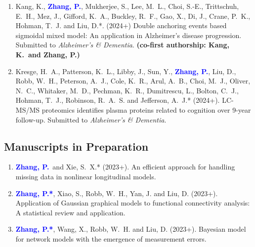\documentclass[12pt]{article}
\newcommand{\PZ}{\textcolor{blue}{\textbf{Zhang, P.*}}}
\newcommand{\PZnot}{\textcolor{blue}{\textbf{Zhang, P.}}}
\begin{document}
\begin{enumerate}
		\item {\sc Kang, K.}, \PZnot, {\sc Mukherjee, S., Lee, M.\ 
		L., Choi, S.-E., Trittschuh, E.\ H., Mez, J., Gifford, K.\ 
		A., Buckley, R.\ F., Gao, X., Di, J., Crane, P.\ K., Hohman, 
		T.\ J.} and {\sc Liu, D.*}. (2024+) Double anchoring events 
		based sigmoidal mixed model: An application in Alzheimer's 
		disease progression. Submitted to {\em Alzheimer's \& 
		Dementia}. {\bf (co-first authorship: Kang, K.\ and Zhang, 
		P.)}
		
		\item {\sc Kresge, H.\ A., Patterson, K.\ L., Libby, J., 
		Sun, Y.,} \PZnot, {\sc Liu, D., Robb, W.\ H., Peterson, A.\ 
		J., Cole, K.\ R., Arul, A.\ B., Choi, M.\ J., Oliver, N.\ 
		C., Whitaker, M.\ D., Pechman, K.\ R., Dumitrescu, L., 
		Bolton, C.\ J., Hohman, T.\ J., Robinson, R.\ A.\ S.} and 
		{\sc Jefferson, A.\ J.*} (2024+). LC-MS/MS proteomics 
		identifies plasma proteins related to cognition over 9-year 
		follow-up. Submitted to {\em Alzheimer's \& Dementia}.
		
	\end{enumerate}
	
	\subsection*{Manuscripts in Preparation}
	\begin{enumerate}
		\item \PZnot\ and {\sc Xie, S.\ X.*} (2023+). An efficient 
		approach for handling missing data in nonlinear longitudinal
		models.	
		
		\item \PZ, {\sc Xiao, S., Robb, W.\ H., Yan, J.} and {\sc 
		Liu, D.} (2023+).
		Application of Gaussian graphical models to functional 
		connectivity analysis: A statistical review and application.
		
		\item \PZ, {\sc Wang, X., Robb, W.\ H.} and {\sc Liu, D.} 
		(2023+). Bayesian model for network models with the 
		emergence of measurement errors.
	\end{enumerate}
	
\end{document}
